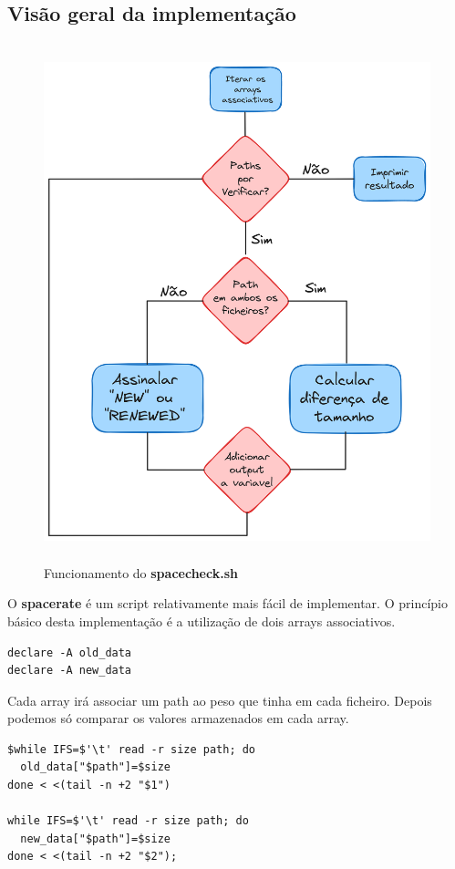 \subsection{Visão geral da implementação}
\begin{figure}[H]
    \centering
    \includegraphics[height=15cm]{Fluxograma_Spacerate.png}
    \caption{Funcionamento do \textbf{spacecheck.sh}}
\end{figure}
O \textbf{spacerate} é um script relativamente mais fácil de
implementar. O princípio básico desta implementação é 
a utilização de dois arrays associativos. 
\begin{verbatim}
declare -A old_data
declare -A new_data
\end{verbatim}
Cada array irá associar um path ao peso que tinha em cada ficheiro.
Depois podemos só comparar os valores armazenados em cada
array.
\begin{verbatim}
$while IFS=$'\t' read -r size path; do
  old_data["$path"]=$size
done < <(tail -n +2 "$1") 

while IFS=$'\t' read -r size path; do
  new_data["$path"]=$size
done < <(tail -n +2 "$2");
\end{verbatim}
